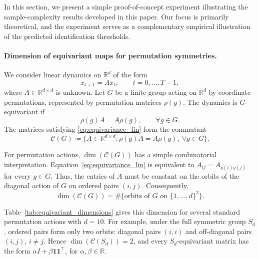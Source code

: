 \documentclass[11pt]{article}
\theoremstyle{plain}
\theoremstyle{definition}
\theoremstyle{remark}
\begin{document}
In this section, we present a simple proof-of-concept experiment illustrating
the sample-complexity results developed in this paper. Our focus is primarily
theoretical, and the experiment serves as a complementary empirical
illustration of the predicted identification thresholds.

\paragraph{Dimension of equivariant maps for permutation symmetries.}
We consider linear dynamics on \(\mathbb{R}^d\) of the form
\begin{equation}
x_{t+1}=Ax_t,\qquad t=0,\ldots,T-1,
\label{eq:lin_dyn_exp}
\end{equation}
where \(A\in\mathbb{R}^{d\times d}\) is unknown. Let \(G\) be a finite group
acting on \(\mathbb{R}^d\) by coordinate permutations, represented by
permutation matrices \(\rho(g)\). The dynamics is \(G\)-equivariant if
\begin{equation}
\rho(g)A=A\rho(g),\qquad \forall g\in G.
\label{eq:equivariance_lin}
\end{equation}
The matrices satisfying \eqref{eq:equivariance_lin} form the commutant
\[
\mathcal C(G)
\coloneqq
\{A\in\mathbb{R}^{d\times d}:
\rho(g)A=A\rho(g),\ \forall g\in G\}.
\]

For permutation actions, \(\dim(\mathcal C(G))\) has a simple combinatorial
interpretation. Equation~\eqref{eq:equivariance_lin} is equivalent to
\(A_{ij}=A_{g(i)g(j)}\) for every \(g\in G\). Thus, the entries of \(A\)
must be constant on the orbits of the diagonal action of \(G\) on ordered
pairs \((i,j)\). Consequently,
\begin{equation}
\dim(\mathcal C(G))
=
\#\{\text{orbits of \(G\) on }\{1,\ldots,d\}^2\}.
\label{eq:orbit_dim}
\end{equation}

Table~\ref{tab:equivariant_dimensions} gives this dimension for several
standard permutation actions with \(d=10\). For example, under the full
symmetric group \(S_d\), ordered pairs form only two orbits: diagonal pairs
\((i,i)\) and off-diagonal pairs \((i,j)\), \(i\neq j\). Hence
\(\dim(\mathcal C(S_d))=2\), and every \(S_d\)-equivariant matrix has the form
\(\alpha I+\beta\mathbf{1}\mathbf{1}^\top\), for
\(\alpha,\beta\in\mathbb{R}\).
\end{document}

